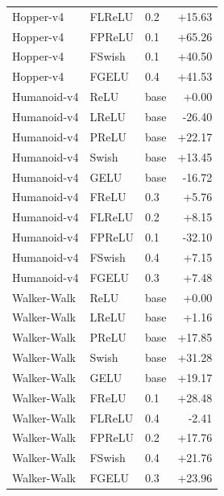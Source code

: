 {\begin{longtable}{lllr}
Hopper-v4 & FLReLU & 0.2 & +15.63 \\
Hopper-v4 & FPReLU & 0.1 & +65.26 \\
Hopper-v4 & FSwish & 0.1 & +40.50 \\
Hopper-v4 & FGELU & 0.4 & +41.53 \\
Humanoid-v4 & ReLU & base & +0.00 \\
Humanoid-v4 & LReLU & base & -26.40 \\
Humanoid-v4 & PReLU & base & +22.17 \\
Humanoid-v4 & Swish & base & +13.45 \\
Humanoid-v4 & GELU & base & -16.72 \\
Humanoid-v4 & FReLU & 0.3 & +5.76 \\
Humanoid-v4 & FLReLU & 0.2 & +8.15 \\
Humanoid-v4 & FPReLU & 0.1 & -32.10 \\
Humanoid-v4 & FSwish & 0.4 & +7.15 \\
Humanoid-v4 & FGELU & 0.3 & +7.48 \\
Walker-Walk & ReLU & base & +0.00 \\
Walker-Walk & LReLU & base & +1.16 \\
Walker-Walk & PReLU & base & +17.85 \\
Walker-Walk & Swish & base & +31.28 \\
Walker-Walk & GELU & base & +19.17 \\
Walker-Walk & FReLU & 0.1 & +28.48 \\
Walker-Walk & FLReLU & 0.4 & -2.41 \\
Walker-Walk & FPReLU & 0.2 & +17.76 \\
Walker-Walk & FSwish & 0.4 & +21.76 \\
Walker-Walk & FGELU & 0.3 & +23.96 \\
\end{longtable}
}
